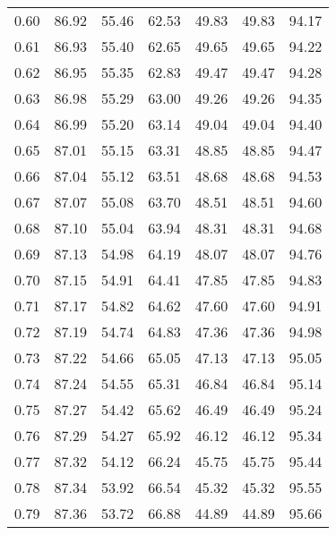 \begin{tabular}{|c|c|c|c|c|c|c|}
      0.60 &     86.92 &     55.46 &      62.53 &   49.83 &      49.83 &         94.17 \\
      0.61 &     86.93 &     55.40 &      62.65 &   49.65 &      49.65 &         94.22 \\
      0.62 &     86.95 &     55.35 &      62.83 &   49.47 &      49.47 &         94.28 \\
      0.63 &     86.98 &     55.29 &      63.00 &   49.26 &      49.26 &         94.35 \\
      0.64 &     86.99 &     55.20 &      63.14 &   49.04 &      49.04 &         94.40 \\
      0.65 &     87.01 &     55.15 &      63.31 &   48.85 &      48.85 &         94.47 \\
      0.66 &     87.04 &     55.12 &      63.51 &   48.68 &      48.68 &         94.53 \\
      0.67 &     87.07 &     55.08 &      63.70 &   48.51 &      48.51 &         94.60 \\
      0.68 &     87.10 &     55.04 &      63.94 &   48.31 &      48.31 &         94.68 \\
      0.69 &     87.13 &     54.98 &      64.19 &   48.07 &      48.07 &         94.76 \\
      0.70 &     87.15 &     54.91 &      64.41 &   47.85 &      47.85 &         94.83 \\
      0.71 &     87.17 &     54.82 &      64.62 &   47.60 &      47.60 &         94.91 \\
      0.72 &     87.19 &     54.74 &      64.83 &   47.36 &      47.36 &         94.98 \\
      0.73 &     87.22 &     54.66 &      65.05 &   47.13 &      47.13 &         95.05 \\
      0.74 &     87.24 &     54.55 &      65.31 &   46.84 &      46.84 &         95.14 \\
      0.75 &     87.27 &     54.42 &      65.62 &   46.49 &      46.49 &         95.24 \\
      0.76 &     87.29 &     54.27 &      65.92 &   46.12 &      46.12 &         95.34 \\
      0.77 &     87.32 &     54.12 &      66.24 &   45.75 &      45.75 &         95.44 \\
      0.78 &     87.34 &     53.92 &      66.54 &   45.32 &      45.32 &         95.55 \\
      0.79 &     87.36 &     53.72 &      66.88 &   44.89 &      44.89 &         95.66 \\

\end{tabular}
